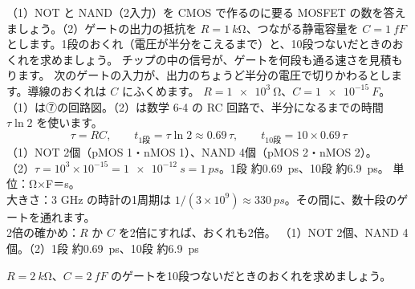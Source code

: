 \label{ph:原-10:ex9}
\begin{phreidai}
（1）NOT と NAND（2入力）を CMOS で作るのに要る MOSFET の数を答えましょう。（2）ゲートの出力の抵抗を $R=\qty{1}{k\ohm}$、つながる静電容量を $C=\qty{1}{fF}$ とします。1段のおくれ（電圧が半分をこえるまで）と、10段つないだときのおくれを求めましょう。
\phbamen
チップの中の信号が、ゲートを何段も通る速さを見積もります。
\phmushi
次のゲートの入力が、出力のちょうど半分の電圧で切りかわるとします。導線のおくれは $C$ にふくめます。
\phzu
$R=\qty{1e3}{\ohm}$、$C=\qty{1e-15}{F}$。
\phriyu
（1）は⑦の回路図。（2）は数学 6-4 の RC 回路で、半分になるまでの時間 $\tau\ln2$ を使います。
\phtateru
\[ \tau=RC,\qquad t_{1段}=\tau\ln2\approx0.69\,\tau,\qquad t_{10段}=10\times0.69\,\tau \]
\phtoku
（1）NOT 2個（pMOS 1・nMOS 1）、NAND 4個（pMOS 2・nMOS 2）。\\
（2）$\tau=10^3\times10^{-15}=\qty{1e-12}{s}=\qty{1}{ps}$。1段 約\qty{0.69}{ps}、10段 約\qty{6.9}{ps}。
\phtashikame
単位：Ω×F＝s。\\
大きさ：3 GHz の時計の1周期は $1/(3\times10^9)\approx\qty{330}{ps}$。その間に、数十段のゲートを通れます。\\
2倍の確かめ：$R$ か $C$ を2倍にすれば、おくれも2倍。
\kotae （1）NOT 2個、NAND 4個。（2）1段 約\qty{0.69}{ps}、10段 約\qty{6.9}{ps}
\end{phreidai}
\begin{jibun}
$R=\qty{2}{k\ohm}$、$C=\qty{2}{fF}$ のゲートを10段つないだときのおくれを求めましょう。
\end{jibun}


